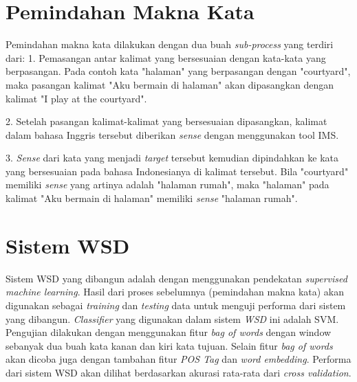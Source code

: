\section{Pemindahan Makna Kata} \label{sec:Pemindahan Makna Kata}
Pemindahan makna kata dilakukan dengan dua buah \textit{sub-process} yang terdiri dari:
1. Pemasangan antar kalimat yang bersesuaian dengan kata-kata yang berpasangan. Pada contoh kata "halaman" yang berpasangan dengan "courtyard", maka pasangan kalimat "Aku bermain di halaman" akan dipasangkan dengan kalimat "I play at the courtyard".

2. Setelah pasangan kalimat-kalimat yang bersesuaian dipasangkan, kalimat dalam bahasa Inggris tersebut diberikan \textit{sense} dengan menggunakan tool IMS.

3. \textit{Sense} dari kata yang menjadi \textit{target} tersebut kemudian dipindahkan ke kata yang bersesuaian pada bahasa Indonesianya di kalimat tersebut. Bila "courtyard" memiliki \textit{sense} yang artinya adalah "halaman rumah", maka "halaman" pada kalimat "Aku bermain di halaman" memiliki \textit{sense} "halaman rumah".

\section{Sistem WSD} \label{sec:Sistem WSD}
Sistem WSD yang dibangun adalah dengan menggunakan pendekatan \textit{supervised machine learning}. Hasil dari proses sebelumnya (pemindahan makna kata) akan digunakan sebagai \textit{training} dan \textit{testing} data untuk menguji performa dari sistem yang dibangun. \textit{Classifier} yang digunakan dalam sistem \textit{WSD} ini adalah SVM. Pengujian dilakukan dengan menggunakan fitur \textit{bag of words} dengan window sebanyak dua buah kata kanan dan kiri kata tujuan. Selain fitur \textit{bag of words} akan dicoba juga dengan tambahan fitur \textit{POS Tag} dan \textit{word embedding}. Performa dari sistem WSD akan dilihat berdasarkan akurasi rata-rata dari \textit{cross validation}.